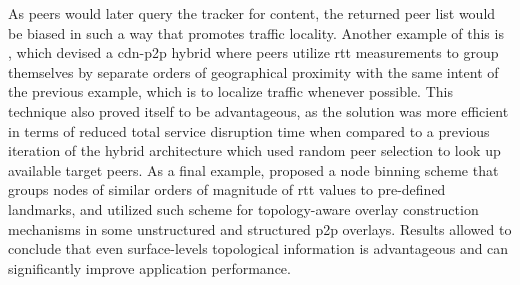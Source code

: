 \begin{itemize}
            As peers would later query the tracker for content, the returned peer list would be biased in such a way that promotes traffic locality.
            Another example of this is \cite{kim2011}, which devised a \gls{cdn}-\gls{p2p} hybrid where peers utilize \gls{rtt} measurements to group themselves by separate orders of geographical proximity with the same intent of the previous example, which is to localize traffic whenever possible.
            This technique also proved itself to be advantageous, as the solution was more efficient in terms of reduced total service disruption time when compared to a previous iteration of the hybrid architecture which used random peer selection to look up available target peers.
            As a final example, \cite{topology-aware-p2p-server-selection} proposed a node binning scheme that groups nodes of similar orders of magnitude of \gls{rtt} values to pre-defined landmarks, and utilized such scheme for topology-aware overlay construction mechanisms in some unstructured and structured \gls{p2p} overlays.
            Results allowed to conclude that even surface-levels topological information is advantageous and can significantly improve application performance.


\end{itemize}
